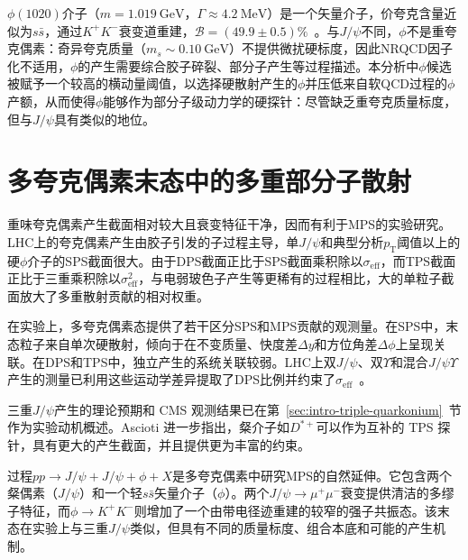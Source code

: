 
$\phi(1020)$介子（$m = \SI{1.019}{\giga\eV}$，$\Gamma \approx \SI{4.2}{\mega\eV}$）是一个矢量介子，价夸克含量近似为$s\bar{s}$，通过$K^+K^-$衰变道重建，$\mathcal{B} = (49.9 \pm 0.5)\%$~\cite{PDG2024}。与$J/\psi$不同，$\phi$不是重夸克偶素：奇异夸克质量（$m_s \sim \SI{0.10}{\giga\eV}$）不提供微扰硬标度，因此NRQCD因子化不适用，$\phi$的产生需要综合胶子碎裂、部分子产生等过程描述。本分析中$\phi$候选被赋予一个较高的横动量阈值，以选择硬散射产生的$\phi$并压低来自软QCD过程的$\phi$产额，从而使得$\phi$能够作为部分子级动力学的硬探针：尽管缺乏重夸克质量标度，但与$J/\psi$具有类似的地位。

\section{多夸克偶素末态中的多重部分子散射}
\label{sec:theory-multiquarkonium-mps}


重味夸克偶素产生截面相对较大且衰变特征干净，因而有利于MPS的实验研究。LHC上的夸克偶素产生由胶子引发的子过程主导，单$J/\psi$和典型分析$p_{\mathrm T}$阈值以上的硬$\phi$介子的SPS截面很大。由于DPS截面正比于SPS截面乘积除以$\sigma_\mathrm{eff}$，而TPS截面正比于三重乘积除以$\sigma_\mathrm{eff}^2$，与电弱玻色子产生等更稀有的过程相比，大的单粒子截面放大了多重散射贡献的相对权重。


在实验上，多夸克偶素态提供了若干区分SPS和MPS贡献的观测量。在SPS中，末态粒子来自单次硬散射，倾向于在不变质量、快度差$\Delta y$和方位角差$\Delta\phi$上呈现关联。在DPS和TPS中，独立产生的系统关联较弱。LHC上双$J/\psi$、双$\Upsilon$和混合$J/\psi\Upsilon$产生的测量已利用这些运动学差异提取了DPS比例并约束了$\sigma_\mathrm{eff}$~\cite{CMS_JPSI_PAIR_7TEV,ATLAS_JPSIJPSI_8TEV,CMS_YY_8TEV,BORSCHENSKY_KULESZA_2017}。


三重$J/\psi$产生的理论预期和 CMS 观测结果已在第~\ref{sec:intro-triple-quarkonium}~节作为实验动机概述。Ascioti 进一步指出，粲介子如$D^{*+}$可以作为互补的 TPS 探针，具有更大的产生截面，并且提供更为丰富的约束\cite{ascioti_2022_6fw3g-xj153}。

过程$pp \to J/\psi+J/\psi+\phi+X$是多夸克偶素中研究MPS的自然延伸。它包含两个粲偶素（$J/\psi$）和一个轻$s\bar{s}$矢量介子（$\phi$）。两个$J/\psi \to \mu^+\mu^-$衰变提供清洁的多缪子特征，而$\phi \to K^+K^-$则增加了一个由带电径迹重建的较窄的强子共振态。该末态在实验上与三重$J/\psi$类似，但具有不同的质量标度、组合本底和可能的产生机制。

